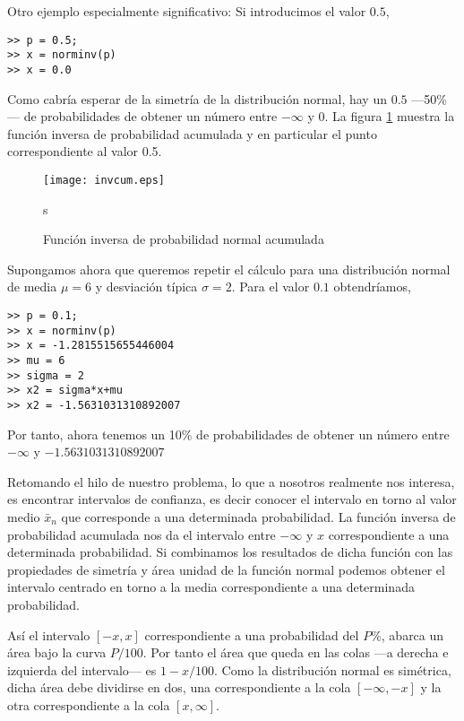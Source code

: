 Otro ejemplo especialmente significativo: Si introducimos el valor $0.5$, 

\begin{verbatim}
>> p = 0.5;
>> x = norminv(p)
>> x = 0.0
\end{verbatim}

Como cabría esperar de la simetría de la distribución normal, hay un $0.5$ ---50\%--- de probabilidades de obtener un número entre $-\infty$ y $0$.  La figura \ref{fig:invcum} muestra la función inversa de probabilidad acumulada y en particular el punto  correspondiente al valor 0.5.

\begin{figure}[h]
\centering
\texttt{[image: invcum.eps]}
\caption{Función inversa  de probabilidad normal acumulada}
\label{fig:invcum}s
\end{figure}

Supongamos ahora que queremos repetir el cálculo para una distribución normal de media $\mu=6$ y desviación típica $\sigma = 2$. Para el valor $0.1$ obtendríamos,

\begin{verbatim}
>> p = 0.1;
>> x = norminv(p)
>> x = -1.2815515655446004
>> mu = 6
>> sigma = 2
>> x2 = sigma*x+mu
>> x2 = -1.5631031310892007
\end{verbatim}

Por tanto, ahora tenemos un 10\% de probabilidades de obtener un número entre $-\infty$ y $-1.5631031310892007$

Retomando el hilo de nuestro problema, lo que a nosotros realmente nos interesa, es encontrar intervalos de confianza, es decir conocer el intervalo en torno al valor medio $\bar{x}_n$ que corresponde a una determinada probabilidad. La función inversa de probabilidad acumulada nos da el intervalo entre $-\infty$ y $x$ correspondiente a una determinada probabilidad. Si combinamos los resultados de dicha función con las propiedades de simetría y área unidad de la función normal podemos obtener el intervalo centrado en torno a la media correspondiente a una determinada probabilidad.

Así el intervalo $[-x ,x]$ correspondiente a  una probabilidad del $P\%$, abarca un área bajo la curva $P/100$. Por tanto el área que queda en las colas ---a derecha e izquierda del intervalo--- es $1-x/100$. Como la distribución normal es simétrica, dicha área debe dividirse en dos, una correspondiente a la cola $[-\infty, -x]$ y la otra correspondiente a la cola $[x, \infty]$.

